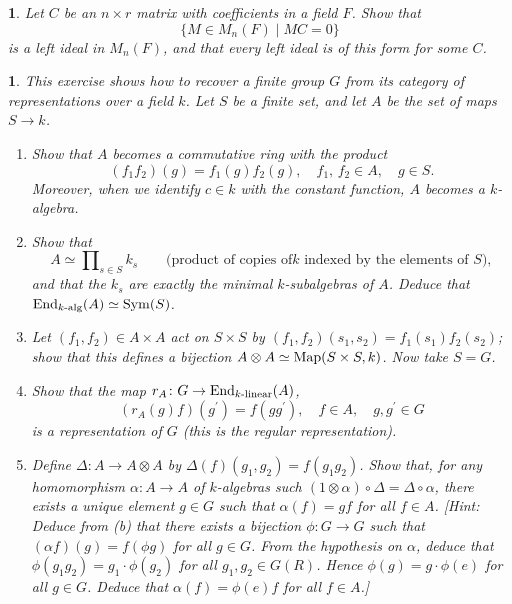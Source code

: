 \documentclass[a4paper,11pt,final]{memoir}%
\newtheorem{exercise}[Y]{}
\theoremstyle{nonumberplain}
\begin{document}
\begin{exercise}
\label{x40}Let $C$ be an $n\times r$ matrix with coefficients in a field $F$.
Show that%
\[
\{M\in M_{n}(F)\mid MC=0\}
\]
is a left ideal in $M_{n}(F)$, and that every left ideal is of this form for
some $C$.
\end{exercise}

\begin{exercise}
\label{x41}This exercise shows how to recover a finite group $G$ from its
category of representations over a field $k$. Let $S$ be a finite set, and let
$A$ be the set of maps $S\rightarrow k$.

\begin{enumerate}
\item Show that $A$ becomes a commutative ring with the product%
\[
(f_{1}f_{2})(g)=f_{1}(g)f_{2}(g),\quad f_{1}\text{, }f_{2}\in A,\quad g\in S.
\]
Moreover, when we identify $c\in k$ with the constant function, $A$ becomes a
$k$-algebra.

\item Show that
\[
A\simeq\prod\nolimits_{s\in S}k_{s}\quad\quad\text{(product of copies of
}k\text{ indexed by the elements of }S\text{)},
\]
and that the $k_{s}$ are exactly the minimal $k$-subalgebras of $A$. Deduce
that $\operatorname{End}_{k\text{-alg}}(A)\simeq\operatorname{Sym}(S)$.

\item Let $(f_{1},f_{2})\in A\times A$ act on $S\times S$ by $(f_{1}%
,f_{2})(s_{1},s_{2})=f_{1}(s_{1})f_{2}(s_{2})$; show that this defines a
bijection $A\otimes A\simeq\operatorname{Map}(S\times S,k)$. Now take $S=G$.

\item Show that the map $r_{A}\colon G\rightarrow\operatorname{End}_{k\text{-linear}}(A)$,
\[
(r_{A}(g)f)(g^{\prime})=f(gg^{\prime}),\quad f\in A,\quad g,g^{\prime}\in G
\]
is a representation of $G$ (this is the regular representation).

\item Define $\Delta\colon A\rightarrow A\otimes A$ by $\Delta(f)(g_{1}%
,g_{2})=f(g_{1}g_{2})$. Show that, for any homomorphism $\alpha\colon
A\rightarrow A$ of $k$-algebras such $(1\otimes\alpha)\circ\Delta=\Delta
\circ\alpha$, there exists a unique element $g\in G$ such that $\alpha(f)=gf$
for all $f\in A$. [Hint: Deduce from (b) that there exists a bijection
$\phi\colon G\rightarrow G$ such that $\left(  \alpha f\right)  (g)=f(\phi g)$
for all $g\in G$. From the hypothesis on $\alpha$, deduce that $\phi
(g_{1}g_{2})=g_{1}\cdot\phi(g_{2})$ for all $g_{1},g_{2}\in G(R)$. Hence
$\phi(g)=g\cdot\phi(e)$ for all $g\in G$. Deduce that $\alpha(f)=\phi(e)f$ for
all $f\in A$.]


\end{enumerate}
\end{exercise}
\end{document}
